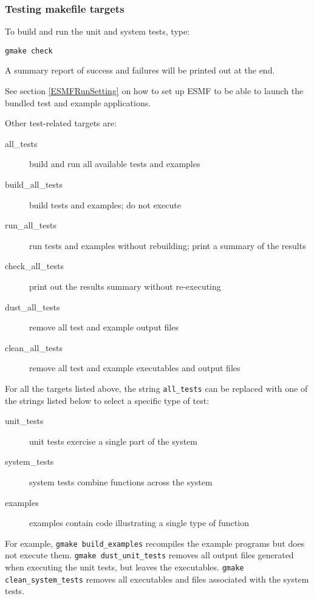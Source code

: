\subsubsection{Testing makefile targets}

To build and run the unit and system tests, type:
\begin{verbatim}
gmake check
\end{verbatim}
A summary report of success and failures will be printed out at the end.

See section \ref{ESMFRunSetting} on how to set up ESMF to be able to launch
the bundled test and example applications.

\noindent Other test-related targets are:
\begin{description}
\item[all\_tests] build and run all available tests and examples
\item[build\_all\_tests] build tests and examples; do not execute
\item[run\_all\_tests] run tests and examples without rebuilding; print a
summary of the results
\item[check\_all\_tests] print out the results summary without re-executing
\item[dust\_all\_tests] remove all test and example output files
\item[clean\_all\_tests] remove all test and example executables and output
files
\end{description}

For all the targets listed above, the string {\tt all\_tests} can be
replaced with one of the strings listed below to select a
specific type of test:
\begin{description}
\item[unit\_tests] unit tests exercise a single part of the system
\item[system\_tests] system tests combine functions across the system
\item[examples] examples contain code illustrating a single type of function
\end{description}
For example, {\tt gmake build\_examples} recompiles the example programs but 
does not execute them. {\tt gmake dust\_unit\_tests} removes all
output files generated when executing the unit tests, but leaves the
executables. {\tt gmake clean\_system\_tests} removes all executables and files
associated with the system tests.

